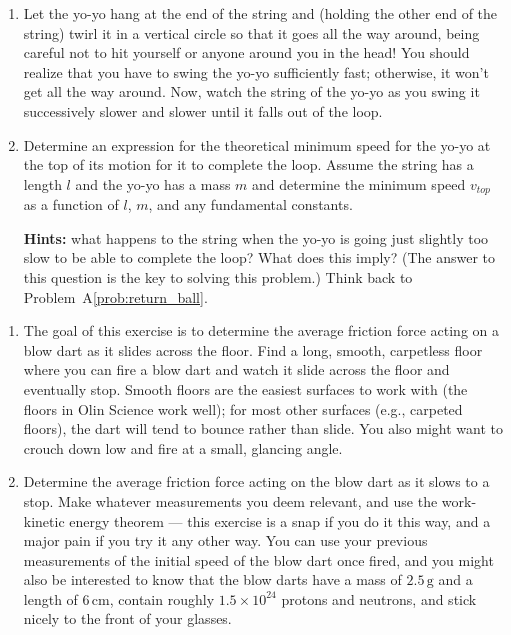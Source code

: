 \begin{exercise}
  \begin{enumerate}
  \item Let the yo-yo hang at the end of the string and (holding the
    other end of the string) twirl it in a vertical circle so that it
    goes all the way around, being careful not to hit yourself or
    anyone around you in the head!  You should realize that you have
    to swing the yo-yo sufficiently fast; otherwise, it won't get all
    the way around.  Now, watch the string of the yo-yo as you swing
    it successively slower and slower until it falls out of the loop.

  \item Determine an expression for the theoretical minimum speed for
    the yo-yo at the top of its motion for it to complete the loop.
    Assume the string has a length $l$ and the yo-yo has a mass $m$
    and determine the minimum speed $v_{ top}$ as a function of
    $l$, $m$, and any fundamental constants.  \vspace{0.1in}

    \textbf{Hints:} what happens to the string when the yo-yo is going
    just slightly too slow to be able to complete the loop?  What does
    this imply?  (The answer to this question is the key to solving
    this problem.)  Think back to Problem~A\ref{prob:return_ball}.
  \end{enumerate}
\end{exercise}




\begin{exercise}
  \begin{enumerate}
  \item The goal of this exercise is to determine the average friction
    force acting on a blow dart as it slides across the floor.  Find a
    long, smooth, carpetless floor where you can fire a blow dart and
    watch it slide across the floor and eventually stop.  Smooth
    floors are the easiest surfaces to work with (the floors in Olin
    Science work well); for most other surfaces (e.g., carpeted
    floors), the dart will tend to bounce rather than slide.  You also
    might want to crouch down low and fire at a small, glancing angle.

  \item Determine the average friction force acting on the blow dart
    as it slows to a stop.  Make whatever measurements you deem
    relevant, and use the work-kinetic energy theorem --- this
    exercise is a snap if you do it this way, and a major pain if you
    try it any other way.  You can use your previous measurements of
    the initial speed of the blow dart once fired, and you might also
    be interested to know that the blow darts have a mass of $2.5\,
    \mbox{g}$ and a length of $6\,\text{cm}$, contain roughly
    $1.5\times 10^{24}$ protons and neutrons, and stick nicely to the
    front of your glasses.
  \end{enumerate}
\end{exercise}


